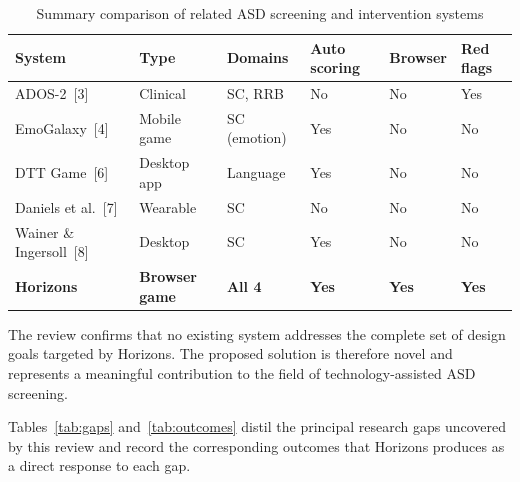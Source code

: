 \documentclass[12pt,a4paper,oneside]{report}
\begin{document}
\begin{table}[t]
  \caption{Summary comparison of related ASD screening and intervention systems}
  \label{tab:related}
  \begin{tabularx}{\linewidth}{lXXXXX}
    \toprule
    \textbf{System} & \textbf{Type} & \textbf{Domains} & \textbf{Auto scoring} & \textbf{Browser} & \textbf{Red flags} \\
    \midrule
    ADOS-2~[3]              & Clinical    & SC, RRB      & No  & No  & Yes \\
    EmoGalaxy~[4]           & Mobile game & SC (emotion) & Yes & No  & No  \\
    DTT Game~[6]            & Desktop app & Language     & Yes & No  & No  \\
    Daniels et al.~[7]      & Wearable    & SC           & No  & No  & No  \\
    Wainer \& Ingersoll~[8] & Desktop     & SC           & Yes & No  & No  \\
    \textbf{Horizons}       & \textbf{Browser game} & \textbf{All 4} & \textbf{Yes} & \textbf{Yes} & \textbf{Yes} \\
    \bottomrule
  \end{tabularx}
\end{table}

The review confirms that no existing system addresses the complete set of design goals targeted by Horizons. The proposed solution is therefore novel and represents a meaningful contribution to the field of technology-assisted ASD screening.

Tables~\ref{tab:gaps} and~\ref{tab:outcomes} distil the principal research gaps uncovered by this review and record the corresponding outcomes that Horizons produces as a direct response to each gap.
\end{document}
